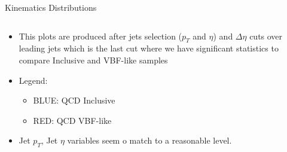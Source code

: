 \documentclass[8pt]{beamer}
\begin{document}
\begin{frame}{Kinematics Distributions}
\begin{columns}
\begin{block}
\begin{itemize}
  \item This plots are produced after jets selection ($p_{T}$ and $\eta$) and $\Delta\eta$ cuts over leading jets which is the last cut where we have
        significant statistics to compare Inclusive and VBF-like samples
  \item Legend:
  \begin{itemize}
    \item BLUE: QCD Inclusive
    \item RED: QCD VBF-like
  \end{itemize}
  \item Jet $p_T$, Jet $\eta$ variables seem o match to a reasonable level.
\end{itemize}

\end{block}

\end{columns}

\end{frame}
\end{document}
